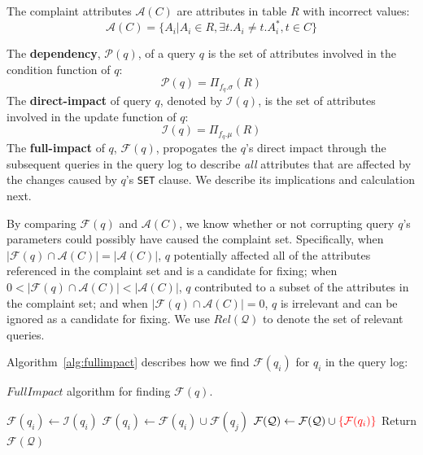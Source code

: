 
\begin{definition} 
	The complaint attributes $\mathcal{A}(C)$ are attributes in 
	table $R$ with incorrect values: 
	\[\mathcal{A}(C) = \{A_i|A_i\in R, \exists t.A_i \neq t.A_i^*, t\in C\}\]
\end{definition} 

\begin{definition}
    The \textbf{dependency}, $\mathcal{P}(q)$, of a query $q$
    is the set of 
    attributes involved in the condition function of $q$:
    \[\mathcal{P}(q) = \Pi_{f_{q}.\sigma}(R)\]
    The \textbf{direct-impact} of query $q$, denoted
    by $\mathcal{I}(q)$, is the set of attributes 
    involved in the update function of $q$:
    \[\mathcal{I}(q) = \Pi_{f_{q}.\mu}(R)\]
    The \textbf{full-impact}
    of $q$, $\mathcal{F}(q)$, propogates the $q$'s direct impact through
    the subsequent queries in the query log to describe {\it all} attributes
    that are affected by the changes caused by $q$'s \texttt{SET} clause.
    We describe its implications and calculation next.
\end{definition}


By comparing $\mathcal{F}(q)$ and $\mathcal{A}(C)$, we know whether
or not corrupting query $q$'s parameters could possibly have caused the complaint
set.  Specifically, when $|\mathcal{F}(q) \cap \mathcal{A}(C)|=|\mathcal{A}(C)|$, 
$q$ potentially affected all of the attributes referenced in the complaint set and is
a candidate for fixing; 
when $0 < |\mathcal{F}(q) \cap \mathcal{A}(C)|< |\mathcal{A}(C)|$, 
$q$ contributed to a subset of the attributes in the complaint set; 
and when $|\mathcal{F}(q) \cap \mathcal{A}(C)|=0$, $q$ is irrelevant 
and can be ignored as a candidate for fixing. 
We use $Rel\mathcal{(Q)}$ to denote the set of relevant queries. 

Algorithm~\ref{alg:fullimpact} describes how we find
$\mathcal{F}(q_i)$ for $q_i$ in the query log:

\begin{algorithm}[htbp]
\caption{$FullImpact$ algorithm for finding $\mathcal{F}(q)$.}
\label{alg:fullimpact}
\begin{algorithmic}
\STATE $\mathcal{F}(q_i) \leftarrow \mathcal{I}(q_i)$
\STATE $\mathcal{F}(q_i) \leftarrow \mathcal{F}(q_i) \cup \mathcal{F}(q_j)$
\ENDIF
\ENDFOR
\STATE $\mathcal{F}(\mathcal{Q}) \leftarrow \mathcal{F}(\mathcal{Q}) \cup {\textcolor{red}{\{\mathcal{F}(q_i)\}}}$
\STATE Return $\mathcal{F}(\mathcal{Q})$
\end{algorithmic}
\end{algorithm}

